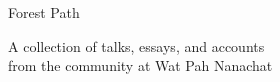 
{\Large Forest Path}

A collection of talks, essays, and accounts\\
from the community at Wat Pah Nanachat

